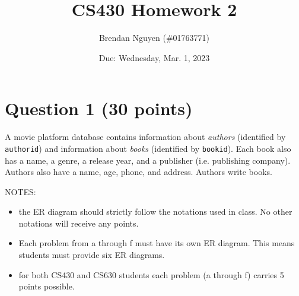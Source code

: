 \documentclass[letterpaper, 11pt]{article}
\title{CS430 Homework 2}
\author{Brendan Nguyen (\#01763771)}
\date{Due: Wednesday, Mar. 1, 2023}
\begin{document}
\maketitle

\section*{Question 1 (30 points)}

A movie platform database contains information about \textit{authors} (identified by \texttt{authorid}) and information about \textit{books} (identified by \texttt{bookid}). Each book also has a name, a genre, a release year, and a publisher (i.e. publishing company). Authors also have a name, age, phone, and address. Authors write books.

NOTES:
\begin{itemize}
    \item the ER diagram should strictly follow the notations used in class. No other notations will receive any points.
    \item Each problem from a through f must have its own ER diagram. This means students must provide six ER diagrams.
    \item for both CS430 and CS630 students each problem (a through f) carries 5 points possible.
\end{itemize}
\end{document}
